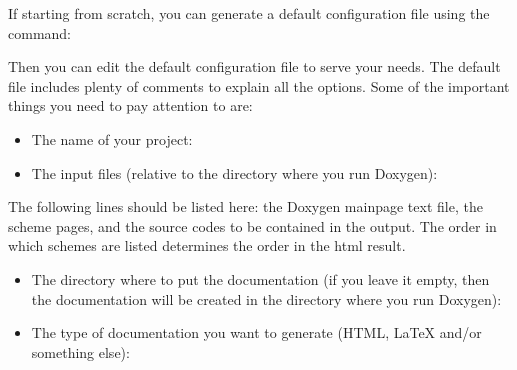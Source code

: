 \documentclass[letterpaper,10pt,english]{sphinxmanual}
\begin{document}
If starting from scratch, you can generate a default configuration file using the command:

\begin{sphinxVerbatim}[commandchars=\\\{\}]
\end{sphinxVerbatim}

Then you can edit the default configuration file to serve your needs. The default
file includes plenty of comments to explain all the options. Some of the important
things you need to pay attention to are:
\begin{itemize}
\item {} 
The name of your project:

\end{itemize}

\begin{sphinxVerbatim}[commandchars=\\\{\}]
\end{sphinxVerbatim}
\begin{itemize}
\item {} 
The input files (relative to the directory where you run Doxygen):

\end{itemize}

\begin{sphinxVerbatim}[commandchars=\\\{\}]
\end{sphinxVerbatim}

The following lines should be listed here: the Doxygen mainpage text file, the
scheme pages, and the source codes to be contained in the output. The order in
which schemes are listed determines the order in the html result.
\begin{itemize}
\item {} 
The directory where to put the documentation (if you leave it empty, then the
documentation will be created in the directory where you run Doxygen):

\end{itemize}

\begin{sphinxVerbatim}[commandchars=\\\{\}]
\end{sphinxVerbatim}
\begin{itemize}
\item {} 
The type of documentation you want to generate (HTML, LaTeX and/or something else):

\end{itemize}
\end{document}
